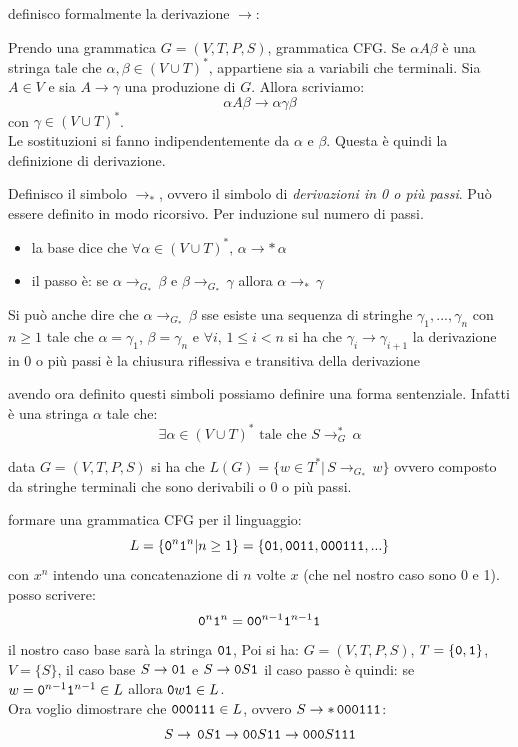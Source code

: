 definisco formalmente la derivazione $\to$:
\begin{definition}
	Prendo una grammatica $G=(V,T,P,S)$, grammatica CFG. Se $\alpha A \beta$ è una stringa tale che $\alpha,\beta\in (V\cup T)^*$, appartiene sia a variabili che terminali. Sia $A\in V$ e sia $A\to \gamma$ una produzione di $G$. Allora
	scriviamo:
	$$\alpha A \beta \to \alpha\gamma\beta$$
	con $\gamma\in (V\cup T)^*$.\\
	Le sostituzioni si fanno indipendentemente da $\alpha$ e $\beta$.
	Questa è quindi la definizione di derivazione.
\end{definition}
\begin{definition}
	Definisco il simbolo $\to _*$, ovvero il simbolo di \textit{derivazioni in 0 o più passi}. Può essere definito in modo ricorsivo. Per induzione sul numero di passi.
	\begin{itemize}
		\item la base dice che  $\forall \alpha\in (V\cup T)^*,\, \alpha\to * \,\alpha$
		\item il passo è: se $\alpha\to_{G_*} \,\beta $ e $ \beta \to_{G_*} \,\gamma$ allora $\alpha\to_* \,\gamma$
	\end{itemize}
	Si può anche dire che $\alpha\to_{G_*}\, \beta$ sse esiste una sequenza di stringhe $\gamma_1,...,\gamma_n$ con $n\geq 1$ tale che $\alpha=\gamma_1$, $\beta=\gamma_n$ e $\forall i,\, 1\le i< n$ si ha che $\gamma_i\to \gamma_{i+1}$
	la derivazione in 0 o più passi è la chiusura riflessiva e transitiva della derivazione
\end{definition}
\begin{definition}
	avendo ora definito questi simboli possiamo definire una forma sentenziale. Infatti è una stringa $\alpha$ tale che:
	$$\exists \alpha\in (V\cup T)^* \mbox{ tale che }S\to_{G}^{*}\, \alpha$$
\end{definition}
\begin{definition}
	data $G=(V,T,P,S)$ si ha che $L(G)=\{w\in T^* |\, S\to_{G_*}\, w\}$ ovvero composto da stringhe terminali che sono derivabili o 0 o più passi.
\end{definition}
\begin{example}
	formare una grammatica CFG per il linguaggio:
	$$L=\{\mathtt{0}^n \mathtt{1}^n| n\geq 1\}=\{\mathtt{0}\mathtt{1}, \mathtt{0}\mathtt{0}\mathtt{1}\mathtt{1}, \mathtt{0}\mathtt{0}\mathtt{0}\mathtt{1}\mathtt{1}\mathtt{1},...\}$$
	con $x^n$ intendo una concatenazione di $n$ volte $x$ (che nel nostro caso sono 0 e 1).\\
	posso scrivere:
	$$\mathtt{0}^n \mathtt{1}^n =\mathtt{0}\mathtt{0}^{n-1} \mathtt{1}^{n-1}\mathtt{1}$$
	il nostro caso base sarà la stringa $\mathtt{0}\mathtt{1}$, Poi si ha:
	$G=(V,T,P,S)$, $T=\{\mathtt{0},\mathtt{1}\}$, $V=\{S\}$, il caso base $S\to \mathtt{0}\mathtt{1}$  e $S\to \mathtt{0} S\mathtt{1}$
	il caso passo è quindi: se $w= \mathtt{0}^{n-1}\mathtt{1}^{n-1}\in L$ allora $\mathtt{0} w\mathtt{1}\in L$.\\
	Ora voglio dimostrare che $\mathtt{0}\mathtt{0}\mathtt{0}\mathtt{1}\mathtt{1}\mathtt{1}\in L$, ovvero $S\to*\, \mathtt{0}\mathtt{0}\mathtt{0}\mathtt{1}\mathtt{1}\mathtt{1}$:\\
	$$S\to\, \mathtt{0} S\mathtt{1} \to \mathtt{0}\mathtt{0} S\mathtt{1}\mathtt{1}\to \mathtt{0}\mathtt{0}\mathtt{0} S\mathtt{1}\mathtt{1}\mathtt{1}$$
\end{example}

